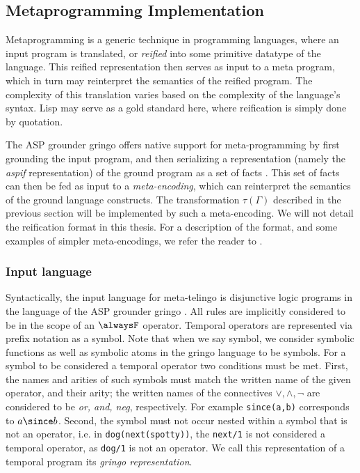 \subsection{Metaprogramming Implementation}

Metaprogramming is a generic technique in programming languages, where
an input program is translated, or \emph{reified} into some primitive
datatype of the language. This reified representation then serves as
input to a meta program, which in turn may reinterpret the semantics
of the reified program. The complexity of this translation varies
based on the complexity of the language's syntax. Lisp may serve as a
gold standard here, where reification is simply done by quotation.

The ASP grounder gringo offers native support for meta-programming by
first grounding the input program, and then serializing a
representation (namely the \emph{aspif}
representation\cite{PotasscoUserGuide19}) of the ground program as a
set of facts \cite{karoscwa21a}. This set of facts can then be fed as
input to a \emph{meta-encoding}, which can reinterpret the semantics
of the ground language constructs. The transformation $\tau(\Gamma)$
described in the previous section will be implemented by such a
meta-encoding. We will not detail the reification format in this
thesis. For a description of the format, and some examples of simpler
meta-encodings, we refer the reader to \cite{karoscwa21a}.

\subsubsection{Input language}

Syntactically, the input language for meta-telingo is disjunctive
logic programs in the language of the ASP grounder gringo
\cite{PotasscoUserGuide19} \cite{gescth07a}. All rules are implicitly
considered to be in the scope of an $\alwaysF$ operator. Temporal
operators are represented via prefix notation as a symbol. Note that
when we say symbol, we consider symbolic functions as well as symbolic
atoms in the gringo language to be symbols. For a symbol to be
considered a temporal operator two conditions must be met. First, the
names and arities of such symbols must match the written name of the
given operator, and their arity; the written names of the connectives
$\vee, \wedge, \neg$ are considered to be \emph{or, and, neg},
respectively. For example \verb|since(a,b)| corresponds to
$a \since b$. Second, the symbol must not occur nested within a symbol
that is not an operator, i.e. in \verb|dog(next(spotty))|, the
\verb|next/1| is not considered a temporal operator, as \verb|dog/1|
is not an operator. We call this representation of a temporal program
its \emph{gringo representation}.

